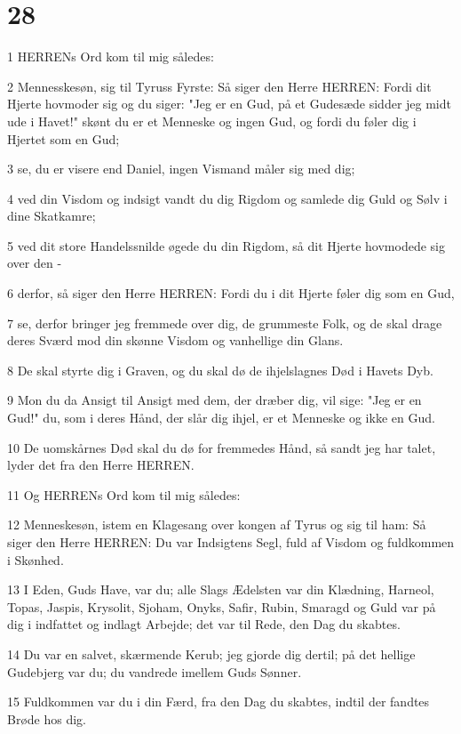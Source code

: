 \chapter{28}

\par 1 HERRENs Ord kom til mig således:
\par 2 Mennesskesøn, sig til Tyruss Fyrste: Så siger den Herre HERREN: Fordi dit Hjerte hovmoder sig og du siger: "Jeg er en Gud, på et Gudesæde sidder jeg midt ude i Havet!" skønt du er et Menneske og ingen Gud, og fordi du føler dig i Hjertet som en Gud;
\par 3 se, du er visere end Daniel, ingen Vismand måler sig med dig;
\par 4 ved din Visdom og indsigt vandt du dig Rigdom og samlede dig Guld og Sølv i dine Skatkamre;
\par 5 ved dit store Handelssnilde øgede du din Rigdom, så dit Hjerte hovmodede sig over den -
\par 6 derfor, så siger den Herre HERREN: Fordi du i dit Hjerte føler dig som en Gud,
\par 7 se, derfor bringer jeg fremmede over dig, de grummeste Folk, og de skal drage deres Sværd mod din skønne Visdom og vanhellige din Glans.
\par 8 De skal styrte dig i Graven, og du skal dø de ihjelslagnes Død i Havets Dyb.
\par 9 Mon du da Ansigt til Ansigt med dem, der dræber dig, vil sige: "Jeg er en Gud!" du, som i deres Hånd, der slår dig ihjel, er et Menneske og ikke en Gud.
\par 10 De uomskårnes Død skal du dø for fremmedes Hånd, så sandt jeg har talet, lyder det fra den Herre HERREN.
\par 11 Og HERRENs Ord kom til mig således:
\par 12 Menneskesøn, istem en Klagesang over kongen af Tyrus og sig til ham: Så siger den Herre HERREN: Du var Indsigtens Segl, fuld af Visdom og fuldkommen i Skønhed.
\par 13 I Eden, Guds Have, var du; alle Slags Ædelsten var din Klædning, Harneol, Topas, Jaspis, Krysolit, Sjoham, Onyks, Safir, Rubin, Smaragd og Guld var på dig i indfattet og indlagt Arbejde; det var til Rede, den Dag du skabtes.
\par 14 Du var en salvet, skærmende Kerub; jeg gjorde dig dertil; på det hellige Gudebjerg var du; du vandrede imellem Guds Sønner.
\par 15 Fuldkommen var du i din Færd, fra den Dag du skabtes, indtil der fandtes Brøde hos dig.
